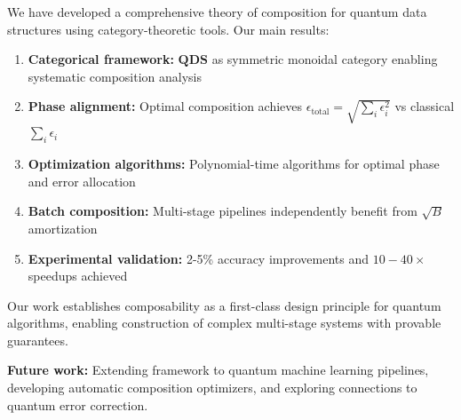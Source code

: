 \documentclass[11pt]{article}
\begin{document}
We have developed a comprehensive theory of composition for quantum data structures using category-theoretic tools. Our main results:

\begin{enumerate}
\item \textbf{Categorical framework:} $\mathbf{QDS}$ as symmetric monoidal category enabling systematic composition analysis

\item \textbf{Phase alignment:} Optimal composition achieves $\epsilon_{\text{total}} = \sqrt{\sum_i \epsilon_i^2}$ vs classical $\sum_i \epsilon_i$

\item \textbf{Optimization algorithms:} Polynomial-time algorithms for optimal phase and error allocation

\item \textbf{Batch composition:} Multi-stage pipelines independently benefit from $\sqrt{B}$ amortization

\item \textbf{Experimental validation:} 2-5\% accuracy improvements and $10-40\times$ speedups achieved
\end{enumerate}

Our work establishes composability as a first-class design principle for quantum algorithms, enabling construction of complex multi-stage systems with provable guarantees.

\textbf{Future work:} Extending framework to quantum machine learning pipelines, developing automatic composition optimizers, and exploring connections to quantum error correction.
\end{document}
